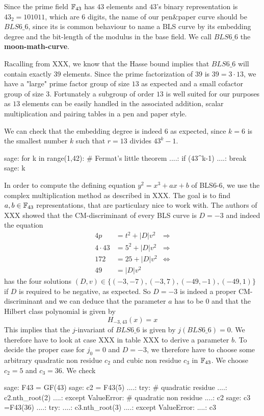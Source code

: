 Since the prime field $\mathbb{F}_{43}$ has $43$ elements and $43$'s binary representation is $43_2= 101011$, which are $6$ digits, the name of our pen\&{}paper curve should be $BLS6\_6$, since its is common behaviour to name a BLS curve by its embedding degree and the bit-length of the modulus in the base field. We call $BLS6\_6$ the \textbf{moon-math-curve}.

Racalling from XXX, we know that the Hasse bound implies that $BLS6\_6$ will contain exactly $39$ elements. Since the prime factorization of $39$ is $39=3\cdot 13$, we have a "large" prime factor group of size $13$ as expected and a small cofactor group of size $3$. Fortunately a subgroup of order $13$ is well suited for our purposes as $13$ elements can be easily handled in the associated addition, scalar multiplication and pairing tables in a pen and paper style.

We can check that the embedding degree is indeed $6$ as expected, since $k = 6$ is the smallest number $k$ such that $r=13$ divides $43^k-1$.
\begin{sagecommandline}
sage: for k in range(1,42): # Fermat's little theorem
....:     if (43^k-1)%
....:         break
sage: k
\end{sagecommandline}
In order to compute the defining equation $y^2=x^3 + ax + b$ of BLS6-6, we use the complex multiplication method as described in XXX. The goal is to find $a,b\in\mathbb{F}_{43}$ representations, that are particulary nice to work with. The authors of XXX showed that the CM-discriminant of every BLS curve is $D=-3$ and indeed the equation
\begin{align*}
4p & = t^2 + |D|v^2 & \Rightarrow \\
4\cdot 43 & = 5^2 + |D|v^2 & \Rightarrow \\
172 & = 25 + |D| v^2 & \Leftrightarrow \\
49 & = |D| v^2
\end{align*}
has the four solutions $(D,v)\in\{(-3,-7),(-3,7),(-49,-1),(-49,1)\}$ if $D$ is required to be negative, as expected. So $D=-3$ is indeed a proper CM-discriminant and we can deduce that the parameter $a$ has to be $0$ and that the Hilbert class polynomial is given by
$$
H_{-3,43}(x) = x
$$
This implies that the $j$-invariant of $BLS6\_6$ is given by $j(BLS6\_6)=0$. We therefore have to look at case XXX in table XXX to derive a parameter $b$. To decide the proper case for $j_0=0$ and $D=-3$, we therefore have to choose some arbitrary quadratic non residue $c_2$ and cubic non residue $c_3$ in $\mathbb{F}_{43}$. We choose $c_2 =5$ and $c_3=36$. We check
\begin{sagecommandline}
sage: F43 = GF(43)
sage: c2 = F43(5)
....: try: # quadratic residue
....:     c2.nth_root(2)
....: except ValueError: # quadratic non residue
....:     c2
sage: c3 =F43(36)
....: try:
....:     c3.nth_root(3)
....: except ValueError:
....:     c3
\end{sagecommandline}

